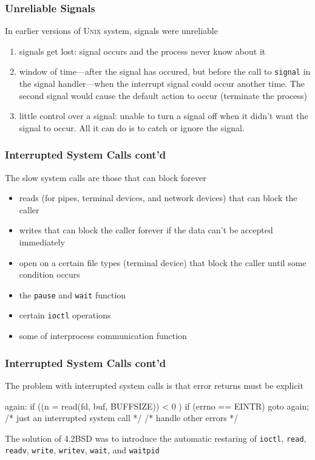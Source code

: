 \documentclass[newPxFont,sthlmFooter,nooffset]{beamer}
\begin{document}
\begin{frame}[t]
  \frametitle{Unreliable Signals}
In earlier versions of \textsc{Unix} system, signals were unreliable

\begin{enumerate}
\item <2-> signals get lost: signal occurs and the process never know about it
\item  <3-> window of time---after the signal has occured, but before the call to \texttt{signal} in the signal handler---when the interrupt signal could occur another time. The second signal would cause the default action to occur (terminate the process)
\item <4-> little control over a signal: unable to turn a signal off when it didn't want the signal to occur. All it can do is to catch or ignore the signal.
\end{enumerate}
\end{frame}

\begin{frame}[t]
  \frametitle{Interrupted System Calls cont'd}
The slow system calls are those that can block forever
\begin{itemize}
\item reads (for pipes, terminal devices, and network devices) that can block the caller
\item writes that can block the caller forever if the data can't be accepted immediately
\item open on a certain file types (terminal device) that block the caller until some condition occurs
\item the \texttt{pause} and \texttt{wait} function
\item certain \texttt{ioctl} operations
\item some of interprocess communication function
\end{itemize}

\end{frame}

\begin{frame}[fragile,t]
  \frametitle{Interrupted System Calls cont'd}
The problem with interrupted system calls is that error returns must be explicit

\begin{codedef}
again:
    if ((n = read(fd, buf, BUFFSIZE)) < 0 ) {
        if (errno == EINTR)
            goto again; /* just an interrupted system call */
        /* handle other errors */
    }
\end{codedef}

The solution of 4.2BSD was to introduce the automatic restaring of \texttt{ioctl}, \texttt{read}, \texttt{readv}, \texttt{write}, \texttt{writev}, \texttt{wait}, and \texttt{waitpid}

\end{frame}
\end{document}
